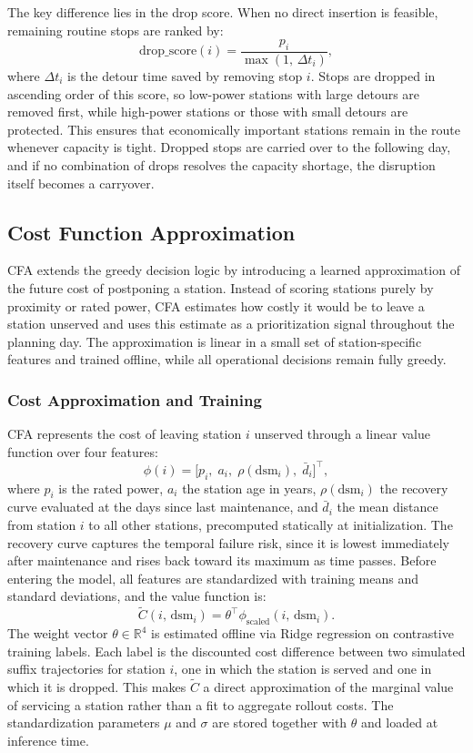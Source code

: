 \documentclass[12pt,oneside]{article}
\begin{document}
The key difference lies in the drop score. When no direct insertion is feasible, remaining routine stops are ranked by:
\[
  \text{drop\_score}(i) = \frac{p_i}{\max(1,\, \Delta t_i)},
\]
where $\Delta t_i$ is the detour time saved by removing stop $i$. Stops are dropped in ascending order of this score, so low-power stations with large detours are removed first, while high-power stations or those with small detours are protected. This ensures that economically important stations remain in the route whenever capacity is tight. Dropped stops are carried over to the following day, and if no combination of drops resolves the capacity shortage, the disruption itself becomes a carryover.

\subsection{Cost Function Approximation}\label{subsec_cost_function_approximation}
CFA extends the greedy decision logic by introducing a learned approximation of the future cost of postponing a station. Instead of scoring stations purely by proximity or rated power, CFA estimates how costly it would be to leave a station unserved and uses this estimate as a prioritization signal throughout the planning day. The approximation is linear in a small set of station-specific features and trained offline, while all operational decisions remain fully greedy.

\subsubsection*{Cost Approximation and Training}
CFA represents the cost of leaving station $i$ unserved through a linear value function over four features:
\[
  \phi(i) = \bigl[p_i,\; a_i,\; \rho(\mathrm{dsm}_i),\; \bar{d}_i\bigr]^\top,
\]
where $p_i$ is the rated power, $a_i$ the station age in years, $\rho(\mathrm{dsm}_i)$ the recovery curve evaluated at the days since last maintenance, and $\bar{d}_i$ the mean distance from station $i$ to all other stations, precomputed statically at initialization. The recovery curve captures the temporal failure risk, since it is lowest immediately after maintenance and rises back toward its maximum as time passes. Before entering the model, all features are standardized with training means and standard deviations, and the value function is:
\[
  \tilde{C}(i,\, \mathrm{dsm}_i) = \theta^\top \phi_{\text{scaled}}(i,\, \mathrm{dsm}_i).
\]
The weight vector $\theta \in \mathbb{R}^4$ is estimated offline via Ridge regression on contrastive training labels. Each label is the discounted cost difference between two simulated suffix trajectories for station $i$, one in which the station is served and one in which it is dropped. This makes $\tilde{C}$ a direct approximation of the marginal value of servicing a station rather than a fit to aggregate rollout costs. The standardization parameters $\mu$ and $\sigma$ are stored together with $\theta$ and loaded at inference time.
\end{document}
